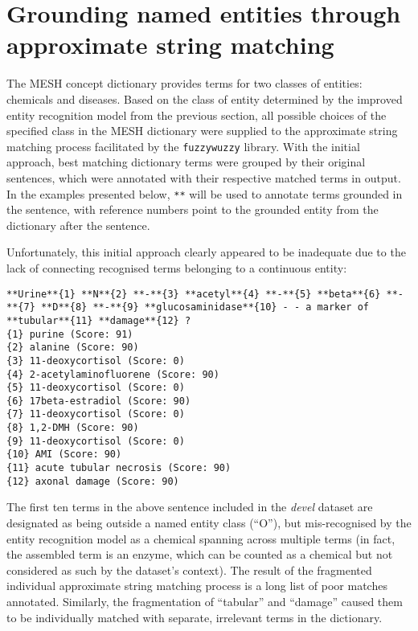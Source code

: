 \documentclass[10pt, oneside]{article}
\begin{document}
\section{Grounding named entities through approximate string matching} \label{sec:grounding}

The MESH concept dictionary provides terms for two classes of entities: chemicals and diseases. Based on the class of entity determined by the improved entity recognition model from the previous section, all possible choices of the specified class in the MESH dictionary were supplied to the approximate string matching process facilitated by the \verb|fuzzywuzzy| \cite{fuzzywuzzy} library. With the initial approach, best matching dictionary terms were grouped by their original sentences, which were annotated with their respective matched terms in output. In the examples presented below, \verb|**| will be used to annotate terms grounded in the sentence, with reference numbers point to the grounded entity from the dictionary after the sentence.

Unfortunately, this initial approach clearly appeared to be inadequate due to the lack of connecting recognised terms belonging to a continuous entity:

\begin{lstlisting}[breaklines]
**Urine**{1} **N**{2} **-**{3} **acetyl**{4} **-**{5} **beta**{6} **-**{7} **D**{8} **-**{9} **glucosaminidase**{10} - - a marker of **tubular**{11} **damage**{12} ?
{1} purine (Score: 91)
{2} alanine (Score: 90)
{3} 11-deoxycortisol (Score: 0)
{4} 2-acetylaminofluorene (Score: 90)
{5} 11-deoxycortisol (Score: 0)
{6} 17beta-estradiol (Score: 90)
{7} 11-deoxycortisol (Score: 0)
{8} 1,2-DMH (Score: 90)
{9} 11-deoxycortisol (Score: 0)
{10} AMI (Score: 90)
{11} acute tubular necrosis (Score: 90)
{12} axonal damage (Score: 90)
\end{lstlisting}

The first ten terms in the above sentence included in the \emph{devel} dataset are designated as being outside a named entity class (``O''), but mis-recognised by the entity recognition model as a chemical spanning across multiple terms (in fact, the assembled term is an enzyme, which can be counted as a chemical but not considered as such by the dataset's context). The result of the fragmented individual approximate string matching process is a long list of poor matches annotated. Similarly, the fragmentation of ``tabular'' and ``damage'' caused them to be individually matched with separate, irrelevant terms in the dictionary.
\end{document}
